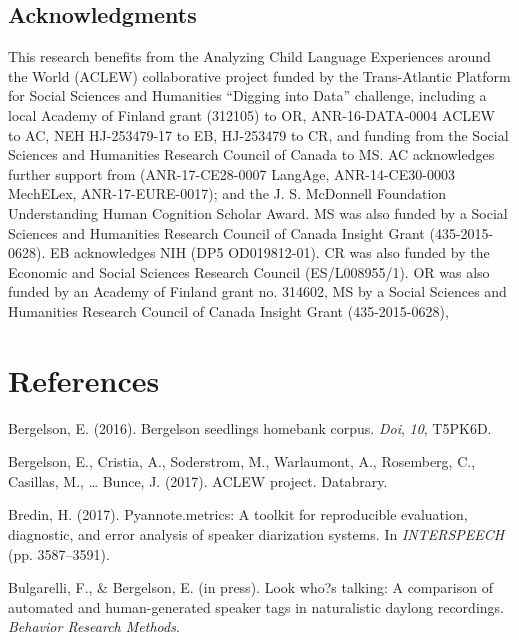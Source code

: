 \documentclass[english,floatsintext,man]{apa6}
\begin{document}
\subsection{Acknowledgments}\label{acknowledgments}

This research benefits from the Analyzing Child Language Experiences
around the World (ACLEW) collaborative project funded by the
Trans-Atlantic Platform for Social Sciences and Humanities
\enquote{Digging into Data} challenge, including a local Academy of
Finland grant (312105) to OR, ANR-16-DATA-0004 ACLEW to AC, NEH
HJ-253479-17 to EB, HJ-253479 to CR, and funding from the Social
Sciences and Humanities Research Council of Canada to MS. AC
acknowledges further support from (ANR-17-CE28-0007 LangAge,
ANR-14-CE30-0003 MechELex, ANR-17-EURE-0017); and the J. S. McDonnell
Foundation Understanding Human Cognition Scholar Award. MS was also
funded by a Social Sciences and Humanities Research Council of Canada
Insight Grant (435-2015-0628). EB acknowledges NIH (DP5 OD019812-01). CR
was also funded by the Economic and Social Sciences Research Council
(ES/L008955/1). OR was also funded by an Academy of Finland grant no.
314602, MS by a Social Sciences and Humanities Research Council of
Canada Insight Grant (435-2015-0628),

\newpage

\section{References}\label{references}

\setlength{\parindent}{-0.5in} \setlength{\leftskip}{0.5in}

\hypertarget{refs}{}
\hypertarget{ref-bergelson2016bergelson}{}
Bergelson, E. (2016). Bergelson seedlings homebank corpus. \emph{Doi},
\emph{10}, T5PK6D.

\hypertarget{ref-bergelson2017}{}
Bergelson, E., Cristia, A., Soderstrom, M., Warlaumont, A., Rosemberg,
C., Casillas, M., \ldots{} Bunce, J. (2017). ACLEW project. Databrary.

\hypertarget{ref-bredin2017pyannote}{}
Bredin, H. (2017). Pyannote.metrics: A toolkit for reproducible
evaluation, diagnostic, and error analysis of speaker diarization
systems. In \emph{INTERSPEECH} (pp. 3587--3591).

\hypertarget{ref-bulgarelli2019}{}
Bulgarelli, F., \& Bergelson, E. (in press). Look who?s talking: A
comparison of automated and human-generated speaker tags in naturalistic
daylong recordings. \emph{Behavior Research Methods}.
\end{document}
